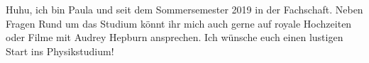 \begin{multicols}{2}
{
Huhu, ich bin Paula und seit dem Sommersemester 2019 in der Fachschaft. Neben Fragen Rund um das Studium könnt ihr mich auch gerne auf royale Hochzeiten oder Filme mit Audrey Hepburn ansprechen. 
Ich wünsche euch einen lustigen Start ins Physikstudium!
}



\end{multicols}
